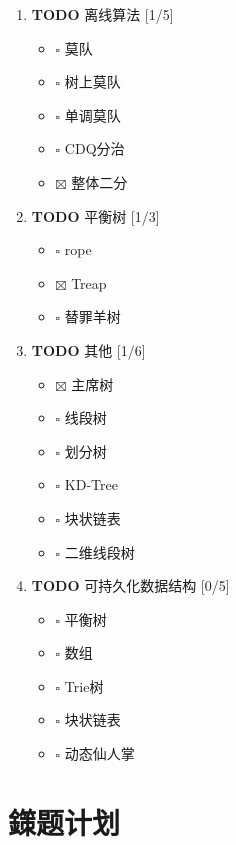 \documentclass[11pt]{article}
\begin{document}
\begin{enumerate}
\item {\bfseries\sffamily TODO} 离线算法 [1/5]
\label{sec-1-1-7-1}

\begin{itemize}
\item $\square$ 莫队
\item $\square$ 树上莫队
\item $\square$ 单调莫队
\item $\square$ CDQ分治
\item $\boxtimes$ 整体二分
\end{itemize}

\item {\bfseries\sffamily TODO} 平衡树 [1/3]
\label{sec-1-1-7-2}

\begin{itemize}
\item $\square$ rope
\item $\boxtimes$ Treap
\item $\square$ 替罪羊树
\end{itemize}

\item {\bfseries\sffamily TODO} 其他 [1/6]
\label{sec-1-1-7-3}

\begin{itemize}
\item $\boxtimes$ 主席树
\item $\square$ 线段树
\item $\square$ 划分树
\item $\square$ KD-Tree
\item $\square$ 块状链表
\item $\square$ 二维线段树
\end{itemize}

\item {\bfseries\sffamily TODO} 可持久化数据结构 [0/5]
\label{sec-1-1-7-4}

\begin{itemize}
\item $\square$ 平衡树
\item $\square$ 数组
\item $\square$ Trie树
\item $\square$ 块状链表
\item $\square$ 动态仙人掌
\end{itemize}
\end{enumerate}

\section{鏼题计划}
\label{sec-2}
\end{document}
